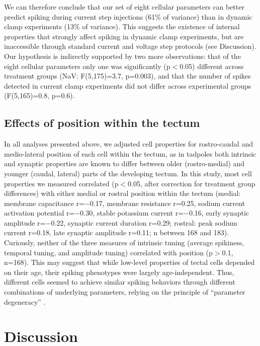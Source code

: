 \documentclass{article}
\begin{document}
We can therefore conclude that our set of eight cellular parameters can better predict spiking during current step injections (61\% of variance) than in dynamic clamp experiments (13\% of variance). This suggests the existence of internal properties that strongly affect spiking in dynamic clamp experiments, but are inaccessible through standard current and voltage step protocols (see Discussion). Our hypothesis is indirectly supported by two more observations: that of the eight cellular parameters only one was significantly (p$<$0.05) different across treatment groups (NaV: F(5,175)=3.7, p=0.003), and that the number of spikes detected in current clamp experiments did not differ across experimental groups (F(5,165)=0.8, p=0.6). 

\subsection*{Effects of position within the tectum}

In all analyses presented above, we adjusted cell properties for rostro-caudal and medio-lateral position of each cell within the tectum, as in tadpoles both intrinsic \citep{hamodi2014} and synaptic properties \citep{wu1996,khakhalin2012} are known to differ between older (rostro-medial) and younger (caudal, lateral) parts of the developing tectum. In this study, most cell properties we measured correlated (p$<$0.05, after correction for treatment group differences) with either medial or rostral position within the tectum (medial: membrane capacitance r=$-$0.17, membrane resistance r=0.25, sodium current activation potential r=$-$0.30, stable potassium current r=$-$0.16, early synaptic amplitude r=$-$0.22, synaptic current duration r=0.29; rostral: peak sodium current r=0.18, late synaptic amplitude r=0.11; n between 168 and 183). Curiously, neither of the three measures of intrinsic tuning (average spikiness, temporal tuning, and amplitude tuning) correlated with position (p$>$0.1, n=168). This may suggest that while low-level properties of tectal cells depended on their age, their spiking phenotypes were largely age-independent. Thus, different cells seemed to achieve similar spiking behaviors through different combinations of underlying parameters, relying on the principle of “parameter degeneracy” \citep{prinz2004degeneracy,drion2015}.


\section*{Discussion}
\end{document}
